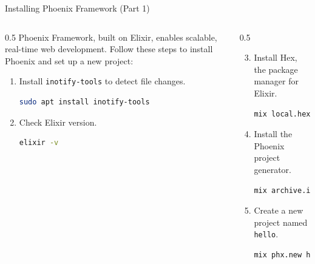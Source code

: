\documentclass[aspectratio=169, table]{beamer}
\begin{document}
\begin{frame}[fragile]{Installing Phoenix Framework (Part 1)}
\vspace{20pt}

\begin{columns}
  \begin{column}[T]{0.5\textwidth}
    Phoenix Framework, built on Elixir, enables scalable, real-time web development.  
    Follow these steps to install Phoenix and set up a new project:

    \begin{enumerate}
      \item Install \texttt{inotify-tools} to detect file changes.
      \begin{lstlisting}[language=bash]
sudo apt install inotify-tools
      \end{lstlisting}

      \item Check Elixir version.
      \begin{lstlisting}[language=bash]
elixir -v
      \end{lstlisting}
    \end{enumerate}
  \end{column}

  \begin{column}[T]{0.5\textwidth}
    \begin{enumerate}
      \setcounter{enumi}{2}
		      \item Install Hex, the package manager for Elixir.
      \begin{lstlisting}[language=bash]
mix local.hex
      \end{lstlisting}
      \item Install the Phoenix project generator.
      \begin{lstlisting}[language=bash]
mix archive.install hex phx_new
      \end{lstlisting}

      \item Create a new project named \texttt{hello}.
      \begin{lstlisting}[language=bash]
mix phx.new hello
      \end{lstlisting}

     
    \end{enumerate}
  \end{column}
\end{columns}
\end{frame}
\end{document}
